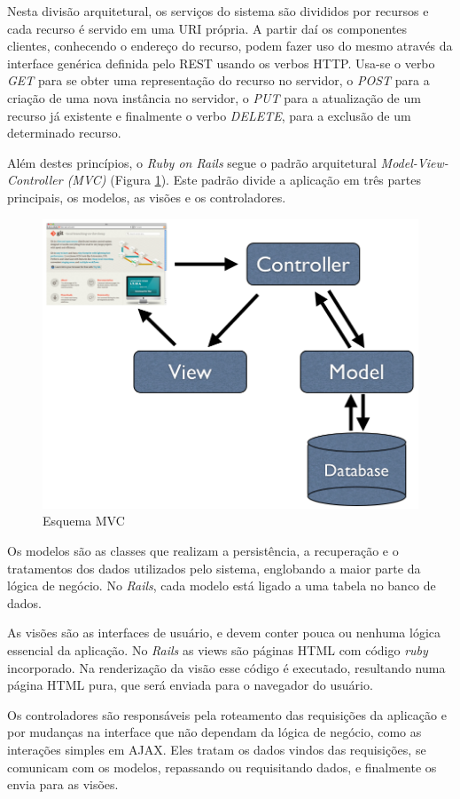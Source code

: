 Nesta divisão arquitetural, os serviços do sistema são divididos por recursos e cada recurso é servido em uma URI própria. A partir daí os componentes clientes, conhecendo o endereço do recurso, podem fazer uso do mesmo através da interface genérica definida pelo REST usando os verbos HTTP. Usa-se o verbo \textit{GET} para se obter uma representação do recurso no servidor, o \textit{POST} para a criação de uma nova instância no servidor, o \textit{PUT} para a atualização de um recurso já existente e finalmente o verbo \textit{DELETE}, para a exclusão de um determinado recurso.

Além destes princípios, o \textit{Ruby on Rails} segue o padrão arquitetural \textit{Model-View-Controller (MVC)} (Figura \ref{figura_23}). Este padrão divide a aplicação em três partes principais, os modelos, as visões e os controladores.

\begin{figure}[ht]
    \centering
    \includegraphics[width=0.9 \textwidth]{figuras/mvc}
    \caption{Esquema MVC}
    \label{figura_23}
\end{figure}

Os modelos são as classes que realizam a persistência, a recuperação e o tratamentos dos dados utilizados pelo sistema, englobando a maior parte da lógica de negócio. No \textit{Rails}, cada modelo está ligado a uma tabela no banco de dados.

As visões são as interfaces de usuário, e devem conter pouca ou nenhuma lógica essencial da aplicação. No \textit{Rails} as views são páginas HTML com código \textit{ruby} incorporado. Na renderização da visão esse código é executado, resultando numa página HTML pura, que será enviada para o navegador do usuário.

Os controladores são responsáveis pela roteamento das requisições da aplicação e por mudanças na interface que não dependam da lógica de negócio, como as interações simples em AJAX. Eles tratam os dados vindos das requisições, se comunicam com os modelos, repassando ou requisitando dados, e finalmente os envia para as visões.
